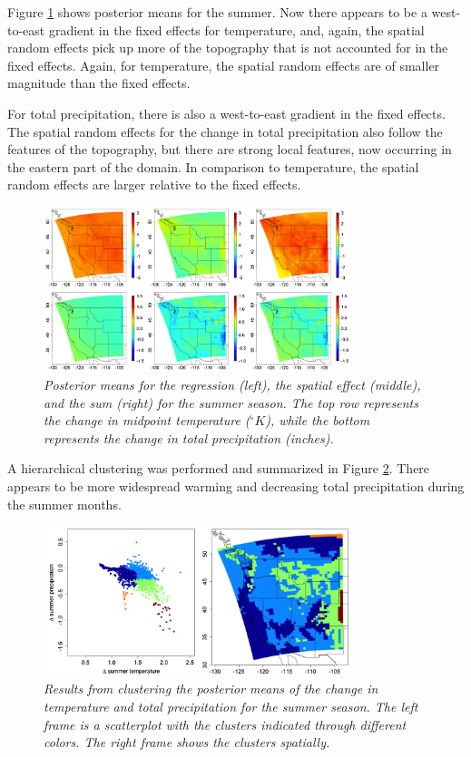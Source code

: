 \documentclass[12pt]{amsart}
\begin{document}
Figure \ref{fig: Fig10} shows posterior means for the summer. Now there appears to be a west-to-east gradient in the fixed effects for temperature, and, again, the spatial random effects pick up more of the topography that is not accounted for in the fixed effects. Again, for temperature, the spatial random effects are of smaller magnitude than the fixed effects.

For total precipitation, there is also a west-to-east gradient in the fixed effects. The spatial random effects for the change in total precipitation also follow the features of the topography, but there are strong local features, now occurring in the eastern part of the domain. In comparison to temperature, the spatial random effects are larger relative to the fixed effects.

\begin{figure}[H]
    \centering
    \includegraphics[width = 0.8\textwidth]{Fig10.png}
    \caption{\emph{Posterior means for the regression (left), the spatial effect (middle), and the sum (right) for the summer season. The top row represents the change in midpoint temperature ($^\circ K$), while the bottom represents the change in total precipitation (inches).}}
    \label{fig: Fig10}
\end{figure}

A hierarchical clustering was performed and summarized in Figure \ref{fig: Fig11}. There appears to be more widespread warming and decreasing total precipitation during the summer months. 

\begin{figure}[H]
    \centering
    \includegraphics[width = 0.8\textwidth]{Fig11.png}
    \caption{\emph{Results from clustering the posterior means of the change in temperature and total precipitation for the summer season. The left frame is a scatterplot with the clusters indicated through different colors. The right frame shows the clusters spatially.}}
    \label{fig: Fig11}
\end{figure}
\end{document}
